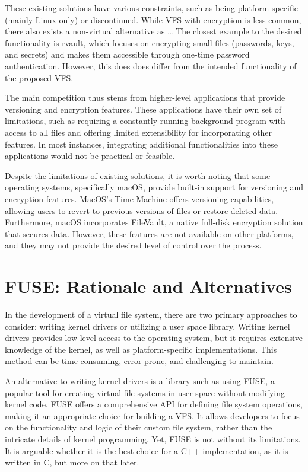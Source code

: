 These existing solutions have various constraints, such as being platform-specific (mainly Linux-only) or discontinued.
While VFS with encryption is less common, there also exists a non-virtual alternative as \ldots %
The closest example to the desired functionality is \href{https://github.com/rmind/rvault}{rvault}, which focuses on encrypting small files (passwords, keys, and secrets) and makes them accessible through one-time password authentication.
However, this does does differ from the intended functionality of the proposed VFS.

The main competition thus stems from higher-level applications that provide versioning and encryption features.
These applications have their own set of limitations, such as requiring a constantly running background program with access to all files and offering limited extensibility for incorporating other features.
In most instances, integrating additional functionalities into these applications would not be practical or feasible.

Despite the limitations of existing solutions, it is worth noting that some operating systems, specifically macOS, provide built-in support for versioning and encryption features.
MacOS's Time Machine offers versioning capabilities, allowing users to revert to previous versions of files or restore deleted data.
Furthermore, macOS incorporates FileVault, a native full-disk encryption solution that secures data.
However, these features are not available on other platforms, and they may not provide the desired level of control over the process.

\section{FUSE: Rationale and Alternatives}\label{sec:fuse-analysis}

In the development of a virtual file system, there are two primary approaches to consider: writing kernel drivers or utilizing a user space library.
Writing kernel drivers provides low-level access to the operating system, but it requires extensive knowledge of the kernel, as well as platform-specific implementations.
This method can be time-consuming, error-prone, and challenging to maintain.

An alternative to writing kernel drivers is a library such as using FUSE, a popular tool for creating virtual file systems in user space without modifying kernel code.
FUSE offers a comprehensive API for defining file system operations, making it an appropriate choice for building a VFS.
It allows developers to focus on the functionality and logic of their custom file system, rather than the intricate details of kernel programming.
Yet, FUSE is not without its limitations.
It is arguable whether it is the best choice for a C++ implementation, as it is written in C, but more on that later.

